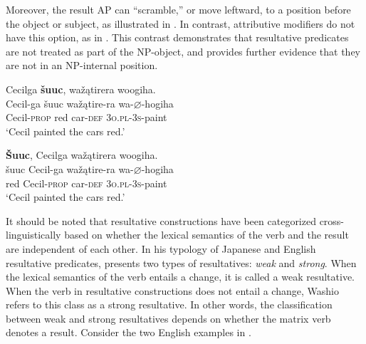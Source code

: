 \documentclass[output=paper]{LSP/langsci}
\begin{document}
Moreover, the result AP can ``scramble,'' or move leftward, to a position before the object or subject, as illustrated in . In contrast, attributive modifiers do not have this option, as in . This contrast demonstrates that resultative predicates are not treated as part of the NP-object, and provides further evidence that they are not in an NP-internal position.

\begin{exe}
\ex\label{ex:rosen:9}
\begin{xlist}

\ex \glll Cecilga \textbf{šuuc}, wažątirera woogiha. \\
 Cecil-ga šuuc  wažątire-ra wa-{$\varnothing$}-hogiha\\
 Cecil-\textsc{prop} red car-\textsc{def} \textsc{3o.pl}-\textsc{3s}-paint \\
\glt `Cecil painted the cars red.'

\ex \glll \textbf{\v{S}uuc}, Cecilga wažątirera woogiha. \\
  šuuc Cecil-ga wažątire-ra wa-{$\varnothing$}-hogiha\\
red Cecil-\textsc{prop} car-\textsc{def} \textsc{3o.pl}-\textsc{3s}-paint \\
\glt `Cecil painted the cars red.'

\end{xlist}




\end{exe}

It should be noted that resultative constructions have been categorized cross-linguistically based on whether the lexical semantics of the verb and the result are independent of each other. In his typology of Japanese and English resultative predicates, \citet{Washio1997} presents two types of resultatives: \textit{weak} and \textit{strong}. When the lexical semantics of the verb entails a change, it is called a weak resultative. When the verb in resultative constructions does not entail a change, Washio refers to this class as a strong resultative. In other words, the classification between weak and strong resultatives depends on whether the matrix verb denotes a result. Consider the two English examples in .
\end{document}
